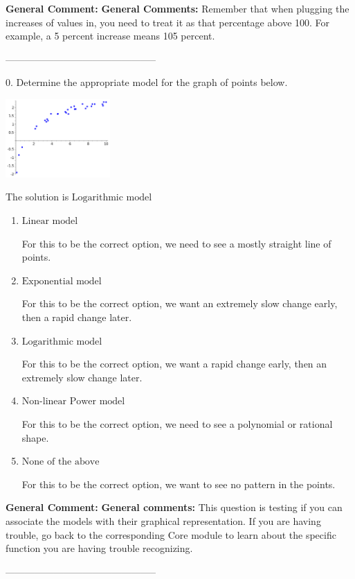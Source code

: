\documentclass{extbook}[14pt]
\begin{document}
\textbf{General Comment:} \textbf{General Comments:} Remember that when plugging the increases of values in, you need to treat it as that percentage above 100. For example, a 5 percent increase means 105 percent. 

-----------------------------------------------

0. Determine the appropriate model for the graph of points below.
\begin{center} \includegraphics[width=0.3\textwidth]{../Figures/identifyModelGraph12B.png} \end{center} 

The solution is $ \text{Logarithmic model} $ 

\begin{enumerate}[label=\Alph*.] 
\item $ \text{Linear model} $ 

 For this to be the correct option, we need to see a mostly straight line of points. 
\item $ \text{Exponential model} $ 

 For this to be the correct option, we want an extremely slow change early, then a rapid change later. 
\item $ \text{Logarithmic model} $ 

 For this to be the correct option, we want a rapid change early, then an extremely slow change later. 
\item $ \text{Non-linear Power model} $ 

 For this to be the correct option, we need to see a polynomial or rational shape. 
\item $ \text{None of the above} $ 

 For this to be the correct option, we want to see no pattern in the points. 
\end{enumerate} 
 
\textbf{General Comment:} \textbf{General comments:} This question is testing if you can associate the models with their graphical representation. If you are having trouble, go back to the corresponding Core module to learn about the specific function you are having trouble recognizing. 

-----------------------------------------------
\end{document}
